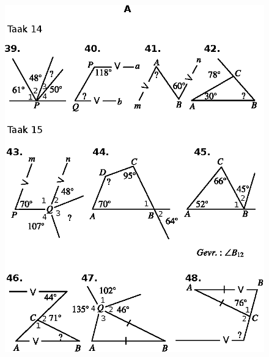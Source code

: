 \begin{figure}[H]
\centering
\includegraphics{figure/fig_02.eps}
\caption{}\label{chap6-fig3}
\end{figure}

\vfill\eject

~\phantom{a}

